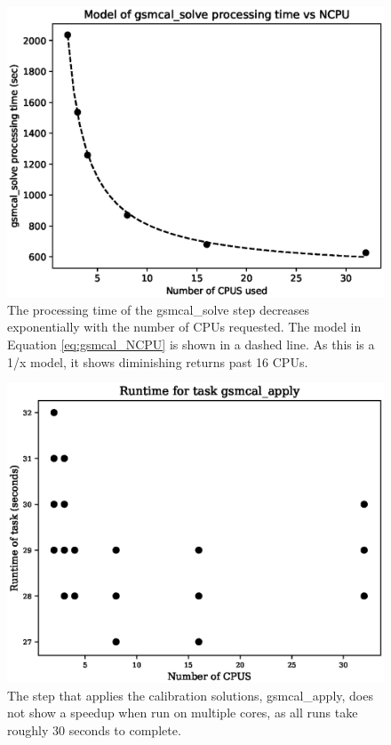 \documentclass[preprint,5p]{elsarticle}
\begin{document}
\begin{figure}
    \includegraphics[width=0.95\linewidth]{figures/gsmcal_NCPU_and_model.eps}
      \caption{The processing time of the {\selectfont gsmcal\_solve} step decreases exponentially with the number of CPUs requested. The model in Equation \ref{eq:gsmcal_NCPU} is shown in a dashed line. As this is a 1/x model, it shows diminishing returns past 16 CPUs. }
	\label{fig:gsmcal_solve_NCPU}
\end{figure}

\begin{figure}
    \includegraphics[width=0.95\linewidth]{figures/gsmcal_apply_NCPU.eps}
      \caption{The step that applies the calibration solutions, {\selectfont gsmcal\_apply}, does not show a speedup when run on multiple cores, as all runs take roughly 30 seconds to complete.  }
	\label{fig:gsmcal_apply_NCPU}
\end{figure}
\end{document}
